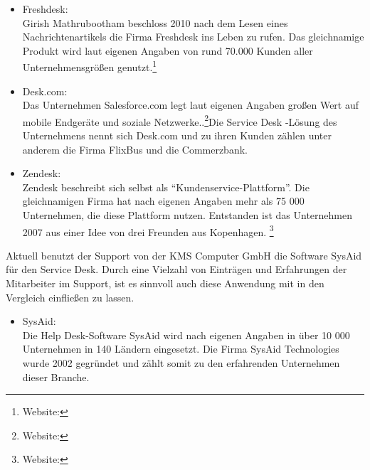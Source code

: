\begin{itemize}
\item Freshdesk:\\
		Girish Mathrubootham beschloss 2010 nach dem Lesen eines Nachrichtenartikels die Firma 
		Freshdesk ins Leben zu rufen. Das gleichnamige Produkt wird laut eigenen Angaben von rund 
		70.000 Kunden aller Unternehmensgrößen genutzt.\footnote{Website:\cite{Freshdesk}}
		\\
		 
\item Desk.com:\\
		Das Unternehmen Salesforce.com legt laut eigenen Angaben großen Wert auf mobile 
		Endgeräte und soziale Netzwerke..\footnote{Website:\cite{Salesforce}}Die Service Desk -Lösung des 
		Unternehmens nennt sich 	Desk.com und zu ihren Kunden zählen unter anderem die Firma FlixBus und die 
		Commerzbank.
		\\
		
\item Zendesk:\\
		Zendesk beschreibt sich selbst als \enquote{Kundenservice-Plattform}. Die gleichnamigen 
		Firma hat nach eigenen Angaben mehr als 75 000 Unternehmen, die diese Plattform nutzen. 
		Entstanden ist das Unternehmen 2007 aus einer Idee von drei Freunden aus Kopenhagen.
		\footnote{Website:\cite{Zendesk}}
		\\		
\end{itemize}

\noindent
Aktuell benutzt der Support von der KMS Computer GmbH die Software SysAid für den Service Desk. Durch eine Vielzahl von Einträgen und Erfahrungen der Mitarbeiter im Support, ist es sinnvoll auch diese Anwendung mit in den Vergleich einfließen zu lassen.

\begin{itemize}
\item SysAid:\\
		 Die Help Desk-Software SysAid wird nach eigenen Angaben in über 10 000 Unternehmen in 
		 140 Ländern eingesetzt. Die Firma SysAid Technologies wurde 2002 gegründet und zählt somit 
		 zu den erfahrenden Unternehmen dieser Branche.
		\\
\end{itemize}	


